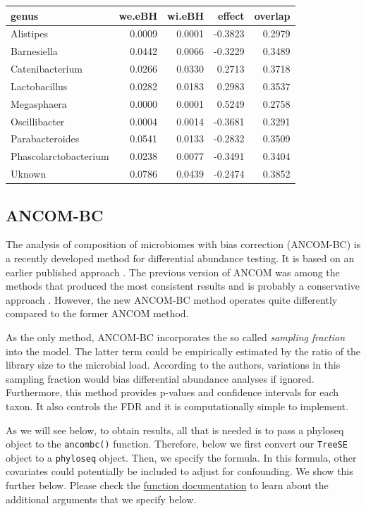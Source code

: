 \documentclass[
]{book}
\begin{document}
\begin{tabular}{l|r|r|r|r}
\hline
genus & we.eBH & wi.eBH & effect & overlap\\
\hline
Alistipes & 0.0009 & 0.0001 & -0.3823 & 0.2979\\
\hline
Barnesiella & 0.0442 & 0.0066 & -0.3229 & 0.3489\\
\hline
Catenibacterium & 0.0266 & 0.0330 & 0.2713 & 0.3718\\
\hline
Lactobacillus & 0.0282 & 0.0183 & 0.2983 & 0.3537\\
\hline
Megasphaera & 0.0000 & 0.0001 & 0.5249 & 0.2758\\
\hline
Oscillibacter & 0.0004 & 0.0014 & -0.3681 & 0.3291\\
\hline
Parabacteroides & 0.0541 & 0.0133 & -0.2832 & 0.3509\\
\hline
Phascolarctobacterium & 0.0238 & 0.0077 & -0.3491 & 0.3404\\
\hline
Uknown & 0.0786 & 0.0439 & -0.2474 & 0.3852\\
\hline
\end{tabular}

\hypertarget{ancom-bc}{%
\subsection{ANCOM-BC}\label{ancom-bc}}

The analysis of composition of microbiomes with bias correction
(ANCOM-BC) \citep{linAnalysisCompositionsMicrobiomes2020}
is a recently developed method for differential abundance testing. It is based
on an
earlier published approach \citep{mandalAnalysisCompositionMicrobiomes2015}.
The previous version of ANCOM was among the methods that produced the
most consistent results and is probably a conservative approach
\citep{nearingMicrobiomeDifferentialAbundance2021}.
However, the new ANCOM-BC method operates quite differently compared to the
former ANCOM method.

As the only method, ANCOM-BC incorporates the so called \emph{sampling fraction}
into the model. The latter term could be empirically estimated by the ratio of
the library size to the microbial load. According to the authors, variations in
this sampling fraction would bias differential abundance analyses if ignored.
Furthermore, this method provides p-values and confidence intervals for each
taxon. It also controls the FDR and it is computationally simple to implement.

As we will see below, to obtain results, all that is needed is to pass
a phyloseq object to the \texttt{ancombc()} function. Therefore, below we first
convert our \texttt{TreeSE} object to a \texttt{phyloseq} object. Then, we specify the formula.
In this formula, other covariates could potentially be included to adjust for
confounding. We show this further below.
Please check the \href{https://rdrr.io/github/FrederickHuangLin/ANCOMBC/man/ancombc.html}{function documentation}
to learn about the additional arguments that we specify below.
\end{document}
